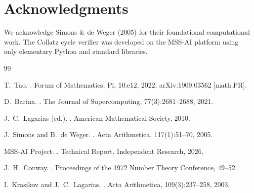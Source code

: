 \documentclass[11pt,a4paper]{article}
\begin{document}
\section*{Acknowledgments}
We acknowledge Simons \& de Weger (2005) for their foundational computational work. The Collatz cycle verifier was developed on the MSS-AI platform using only elementary Python and standard libraries.

\begin{thebibliography}{99}

T.~Tao.
.
\newblock Forum of Mathematics, Pi, 10:e12, 2022.
\newblock arXiv:1909.03562 [math.PR].

D.~Barina.
.
\newblock The Journal of Supercomputing, 77(3):2681--2688, 2021.

J.~C.~Lagarias (ed.).
.
\newblock American Mathematical Society, 2010.

J.~Simons and B.~de Weger.
.
\newblock Acta Arithmetica, 117(1):51--70, 2005.

MSS-AI Project.
.
\newblock Technical Report, Independent Research, 2026.

J.~H.~Conway.
.
\newblock Proceedings of the 1972 Number Theory Conference, 49--52.

I.~Krasikov and J.~C.~Lagarias.
.
\newblock Acta Arithmetica, 109(3):237--258, 2003.

\end{thebibliography}
\end{document}
